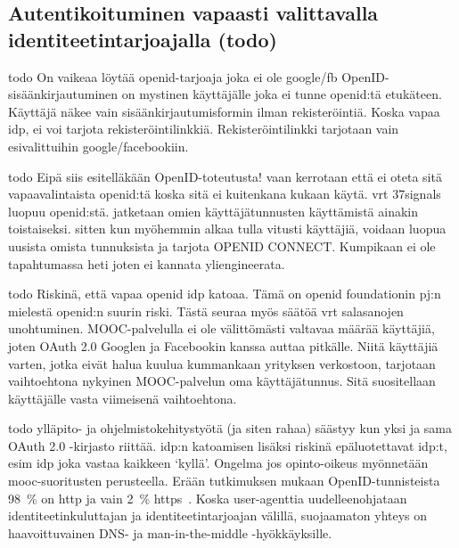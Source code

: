 \documentclass[finnish,gradu]{tktltiki}
\begin{document}
  \subsection{Autentikoituminen vapaasti valittavalla identiteetintarjoajalla (todo)} %
  \label{sub:autentikoituminen_käyttäjäkeskeisellä_identiteetillä}

  todo
  On vaikeaa löytää openid-tarjoaja joka ei ole google/fb
  OpenID-sisäänkirjautuminen on mystinen käyttäjälle joka ei tunne openid:tä etukäteen. Käyttäjä näkee vain sisäänkirjautumisformin ilman rekisteröintiä. Koska vapaa idp, ei voi tarjota rekisteröintilinkkiä. Rekisteröintilinkki tarjotaan vain esivalittuihin google/facebookiin.

  todo
  Eipä siis esitelläkään OpenID-toteutusta! vaan kerrotaan että ei oteta sitä vapaavalintaista openid:tä koska sitä ei kuitenkana kukaan käytä. vrt 37signals luopuu openid:stä. jatketaan omien käyttäjätunnusten käyttämistä ainakin toistaiseksi. sitten kun myöhemmin alkaa tulla vitusti käyttäjiä, voidaan luopua uusista omista tunnuksista ja tarjota OPENID CONNECT. Kumpikaan ei ole tapahtumassa heti joten ei kannata yliengineerata.

  todo
  Riskinä, että vapaa openid idp katoaa. Tämä on openid foundationin pj:n mielestä openid:n suurin riski. Tästä seuraa myös säätöä vrt salasanojen unohtuminen. MOOC-palvelulla ei ole välittömästi valtavaa määrää käyttäjiä, joten OAuth 2.0 Googlen ja Facebookin kanssa auttaa pitkälle. Niitä käyttäjiä varten, jotka eivät halua kuulua kummankaan yrityksen verkostoon, tarjotaan vaihtoehtona nykyinen MOOC-palvelun oma käyttäjätunnus. Sitä suositellaan käyttäjälle vasta viimeisenä vaihtoehtona.

  todo
  ylläpito- ja ohjelmistokehitystyötä (ja siten rahaa) säästyy kun yksi ja sama OAuth 2.0 -kirjasto riittää. idp:n katoamisen lisäksi riskinä epäluotettavat idp:t, esim idp joka vastaa kaikkeen `kyllä'. Ongelma jos opinto-oikeus myönnetään mooc-suoritusten perusteella.
  Erään tutkimuksen mukaan OpenID-tunnisteista 98~\% on http ja vain 2~\% https~\cite{openid_identifier_survey_2011}.
  Koska user-agenttia uudelleenohjataan identiteetinkuluttajan ja identiteetintarjoajan välillä, suojaamaton yhteys on haavoittuvainen DNS- ja man-in-the-middle -hyökkäyksille.



\end{document}
